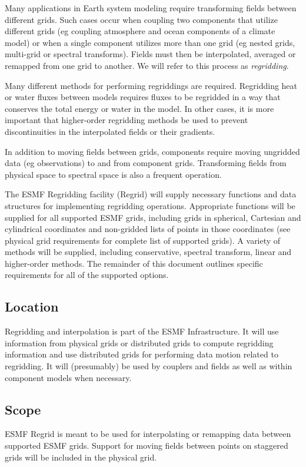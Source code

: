 
Many applications in Earth system modeling require
transforming fields between different grids.  Such
cases occur when coupling two components that utilize
different grids (eg coupling atmosphere and ocean
components of a climate model) or when a single component
utilizes more than one grid (eg nested grids, multi-grid
or spectral transforms).
Fields must then be interpolated, averaged or remapped
from one grid to another.  We will refer to this process
as {\em regridding}. 

Many different methods
for performing regriddings are required.
Regridding heat or water fluxes between models requires
fluxes to be regridded in a way that conserves
the total energy or water in the model.  In other
cases, it is more important that higher-order
regridding methods be used to prevent discontinuities
in the interpolated fields or their gradients.

In addition to moving fields between grids,
components require moving ungridded data (eg observations)
to and from component grids.  Transforming fields
from physical space to spectral space is also
a frequent operation.

The ESMF Regridding facility (Regrid) will
supply necessary functions and data structures for
implementing regridding operations.  Appropriate 
functions will be supplied for all supported ESMF grids,
including grids in spherical, Cartesian and cylindrical
coordinates and non-gridded lists of points
in those coordinates (see physical grid requirements for
complete list of supported grids).  A variety of methods will
be supplied, including conservative, spectral transform,
linear and higher-order methods.  The   
remainder of this document outlines specific requirements
for all of the supported options.

\subsection{Location}

Regridding and interpolation is part of the ESMF
Infrastructure.  It will use information from physical
grids or distributed grids to compute
regridding information and use distributed grids
for performing data motion related to regridding.  It will
(presumably) be used by couplers and fields as well as
within component models when necessary.

\subsection{Scope}

ESMF Regrid is meant to be used for interpolating or
remapping data between supported ESMF grids.  Support
for moving fields between points on staggered grids
will be included in the physical grid.

